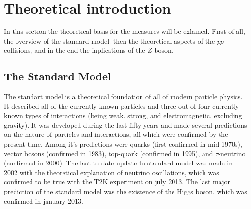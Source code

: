 \chapter{Theoretical introduction}
\label{sec:Theory}

In this section the theoretical basis for the measures will be exlained. First of all, the overview of the standard model, then the theoretical aspects of the $pp$ collisions, and in the end the inplications of the $Z$ boson.

\section{The Standard Model}
\label{sec:theory_SM}

The standart model is a theoretical foundation of all of modern particle physics. It described all of the currently-known particles and three out of four currently-known types of interactions (being weak, strong, and electromagnetic, excluding gravity). It was developed during the last fifty years and made several predictions on the nature of particles and interactions, all which were confirmed by the present time. Among it's predictions were quarks (first confirmed in mid 1970s), vector bosons (confirmed in 1983), top-quark (confirmed in 1995), and $\tau$-neutrino (confirmed in 2000). The last to-date update to standard model was made in 2002 with the theoretical explanation of neutrino oscillations, which was confirmed to be true with the T2K experiment on july 2013. The last major prediction of the standard model was the existence of the Higgs boson, which was confirmed in january 2013.

